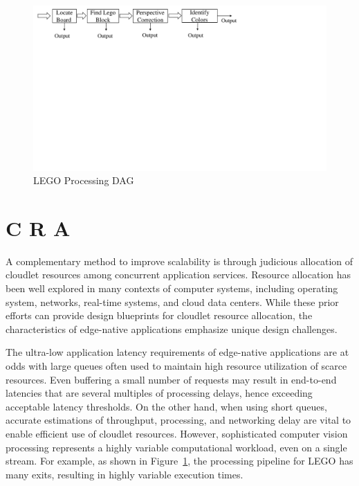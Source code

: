 \begin{figure}
\centering
\includegraphics[width=\linewidth, trim=0em 42.8em 31.5em 1em, clip]{FIGS/fig-lego-dag.pdf}
\vspace{-0.2in}
\caption{\small LEGO Processing DAG}
\label{fig:lego-dag}
\vspace{-0.2in}
\end{figure}

\section{C R A}
\label{sec: resource-allocation}

A complementary method to improve scalability is through judicious
allocation of cloudlet resources among concurrent application
services. Resource allocation has been well explored in many contexts
of computer systems, including operating system, networks, real-time
systems, and cloud data centers.  While these prior efforts can
provide design blueprints for cloudlet resource allocation, the
characteristics of edge-native applications emphasize unique design
challenges.

The ultra-low application latency requirements of edge-native
applications are at odds with large queues often used to maintain high
resource utilization of scarce resources.  Even buffering a small
number of requests may result in end-to-end latencies that are several
multiples of processing delays, hence exceeding acceptable latency
thresholds.  On the other hand, when using short queues, accurate
estimations of throughput, processing, and networking delay are vital
to enable efficient use of cloudlet resources.  However, sophisticated
computer vision processing represents a highly variable computational
workload, even on a single stream. For example, as shown in
Figure~\ref{fig:lego-dag}, the processing pipeline for LEGO has many
exits, resulting in highly variable execution times.

